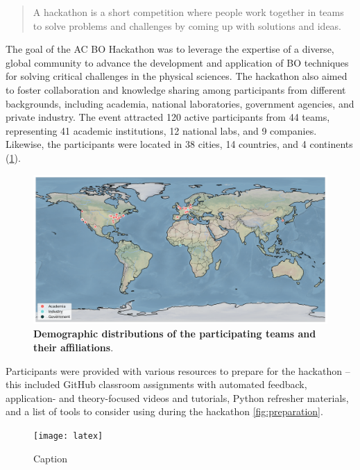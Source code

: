\documentclass[superscriptaddress, nofootinbib,  amsmath, amssymb, preprint]{revtex4-2}
\begin{document}
\begin{quote}
A hackathon is a short competition where people work together in teams to solve problems and challenges by coming up with solutions and ideas.
\end{quote}

The goal of the AC BO Hackathon was to leverage the expertise of a diverse, global community to advance the development and application of BO techniques for solving critical challenges in the physical sciences. The hackathon also aimed to foster collaboration and knowledge sharing among participants from different backgrounds, including academia, national laboratories, government agencies, and private industry. The event attracted 120 active participants from 44 teams, representing 41 academic institutions, 12 national labs, and 9 companies. Likewise, the participants were located in 38 cities, 14 countries, and 4 continents (\cref{fig:map}).

\begin{figure}[h!]
    \centering
    \includegraphics[width=1\textwidth]{latex/figures/world_map.png}
    \caption{\textbf{Demographic distributions of the participating teams and their affiliations}. 
 \label{fig:map}}
\end{figure}

Participants were provided with various resources to prepare for the hackathon – this included GitHub classroom assignments with automated feedback, application- and theory-focused videos and tutorials, Python refresher materials, and a list of tools to consider using during the hackathon \cref{fig:preparation}.

\begin{figure}
    \centering
    \texttt{[image: latex]}
    \caption{Caption}
    \label{fig:enter-label}
\end{figure}
\end{document}
